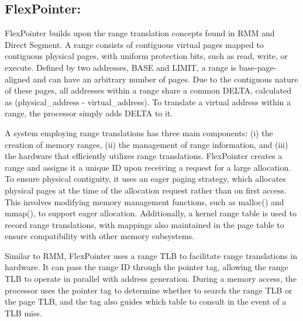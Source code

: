 \subsection{FlexPointer:}
FlexPointer\cite{chen_flexpointer_2023} builds upon the range translation concepts found in RMM and Direct Segment. A range consists of contiguous virtual pages mapped 
to contiguous physical pages, with uniform protection bits, such as read, write, or execute. Defined by two addresses, BASE and LIMIT,
a range is base-page-aligned and can have an arbitrary number of pages. Due to the contiguous nature of these pages, 
all addresses within a range share a common DELTA, calculated as (physical\_address - virtual\_address). To translate a 
virtual address within a range, the processor simply adds DELTA to it.
\newline

A system employing range translations has three main components: 
(i) the creation of memory ranges, (ii) the management of range information, 
and (iii) the hardware that efficiently utilizes range translations. FlexPointer 
creates a range and assigns it a unique ID upon receiving a request for a large 
allocation. To ensure physical contiguity, it uses an eager paging strategy, 
which allocates physical pages at the time of the allocation request rather 
than on first access. This involves modifying memory management functions, 
such as malloc() and mmap(), to support eager allocation. Additionally, 
a kernel range table is used to record range translations, with mappings 
also maintained in the page table to ensure compatibility with other memory subsystems.
\newline

Similar to RMM, FlexPointer uses a range TLB to facilitate range translations in hardware. 
It can pass the range ID through the pointer tag, allowing the range TLB to operate in 
parallel with address generation. During a memory access, the processor uses the 
pointer tag to determine whether to search the range TLB or the page TLB, and the 
tag also guides which table to consult in the event of a TLB miss.
\newline


